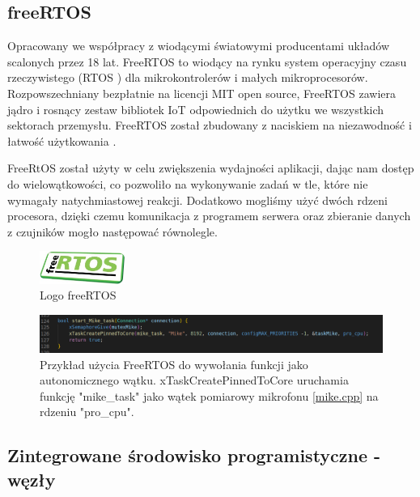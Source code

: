 \documentclass[12pt,oneside,a4paper]{book}
\theoremstyle{break}
\begin{document}
\subsection{freeRTOS}
Opracowany we współpracy z wiodącymi światowymi producentami układów scalonych przez 18 lat.
FreeRTOS to wiodący na rynku system operacyjny czasu rzeczywistego
(RTOS \cite{wiki-rtos}) dla mikrokontrolerów i małych mikroprocesorów. Rozpowszechniany bezpłatnie na licencji MIT
open source, FreeRTOS zawiera jądro i rosnący zestaw bibliotek IoT odpowiednich do użytku we
wszystkich sektorach przemysłu. FreeRTOS został zbudowany z naciskiem na niezawodność i łatwość
użytkowania \cite{freeRTOS}.\\
\par FreeRtOS został użyty w celu zwiększenia wydajności aplikacji, dając nam dostęp do
wielowątkowości, co pozwoliło na wykonywanie zadań w tle, które nie wymagały natychmiastowej
reakcji. Dodatkowo mogliśmy użyć dwóch rdzeni procesora, dzięki czemu komunikacja z programem serwera
oraz zbieranie danych z czujników mogło następować równolegle. 

\begin{figure}[H]
    \begin{center}
        \includegraphics[width=0.25\textwidth]{freertos.jpg}    
        \caption{Logo freeRTOS}
    \end{center}
\end{figure}

\begin{figure}[H]
    \begin{center}
        \includegraphics[width=1\textwidth]{freertos-ex.png}    
        \caption{Przykład użycia FreeRTOS do wywołania funkcji jako autonomicznego wątku.
        xTaskCreatePinnedToCore \cite{freertos-task} uruchamia funkcję "mike\_task" jako wątek pomiarowy mikrofonu \ref*{mike.cpp}
        na rdzeniu "pro\_cpu".}
    \end{center}
\end{figure}

\subsection{Zintegrowane środowisko programistyczne - węzły}
\end{document}
